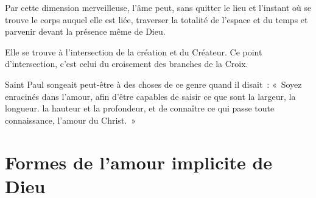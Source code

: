 \documentclass[french,twoside]{book} %
\newcommand\chapteropen{} %
\newcommand\chapterclose{} %
\begin{document}
Par cette dimension merveilleuse, l'âme peut, sans quitter le lieu et l'instant où se trouve le corps auquel elle est liée, traverser la totalité de l'espace et du temps et parvenir devant la présence même de Dieu.\par
Elle se trouve à l'intersection de la création et du Créateur. Ce point d'intersection, c'est celui du croisement des branches de la Croix.\par
Saint Paul songeait peut-être à des choses de ce genre quand il disait : « Soyez enracinés dans l'amour, afin d'être capables de saisir ce que sont la largeur, la longueur. la hauteur et la profondeur, et de connaître ce qui passe toute connaissance, l'amour du Christ. »\par

\begin{center}
\end{center}
\chapterclose


\chapteropen
\chapter[Formes de l'amour implicite de Dieu]{Formes de l'amour implicite de Dieu}
\end{document}
